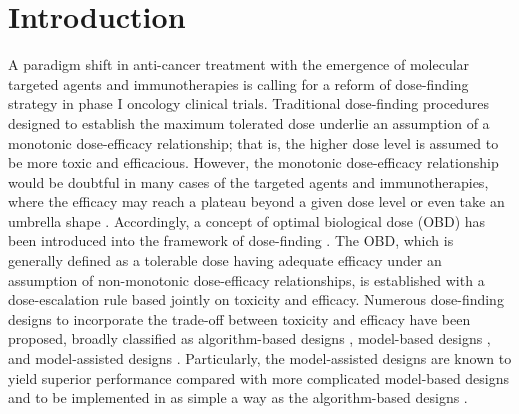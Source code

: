 \section{Introduction}
A paradigm shift in anti-cancer treatment with the emergence of molecular targeted agents and immunotherapies is calling for a reform of dose-finding strategy in phase I oncology clinical trials. Traditional dose-finding procedures designed to establish the maximum tolerated dose underlie an assumption of a monotonic dose-efficacy relationship; that is, the higher dose level is assumed to be more toxic and efficacious. However, the monotonic dose-efficacy relationship would be doubtful in many cases of the targeted agents and immunotherapies, where the efficacy may reach a plateau beyond a given dose level or even take an umbrella shape \citep{calabrese:2001,lorusso:2010,reynolds:2010}. Accordingly, a concept of optimal biological dose (OBD) has been introduced into the framework of dose-finding \citep{corbaux:2019,fraisse:2021}. The OBD, which is generally defined as a tolerable dose having adequate efficacy under an assumption of non-monotonic dose-efficacy relationships, is established with a dose-escalation rule based jointly on toxicity and efficacy. Numerous dose-finding designs to incorporate the trade-off between toxicity and efficacy have been proposed, broadly classified as algorithm-based designs \citep{lin:2020a}, model-based designs \citep{thall:2004,yuan:2016,riviere:2018}, and model-assisted designs \citep{takeda:2018,yuan:2019,li:2020,lin:2020b,yin:2020,lin:2021}. Particularly, the model-assisted designs are known to yield superior performance compared with more complicated model-based designs and to be implemented in as simple a way as the algorithm-based designs \citep{yuan:2019}.

